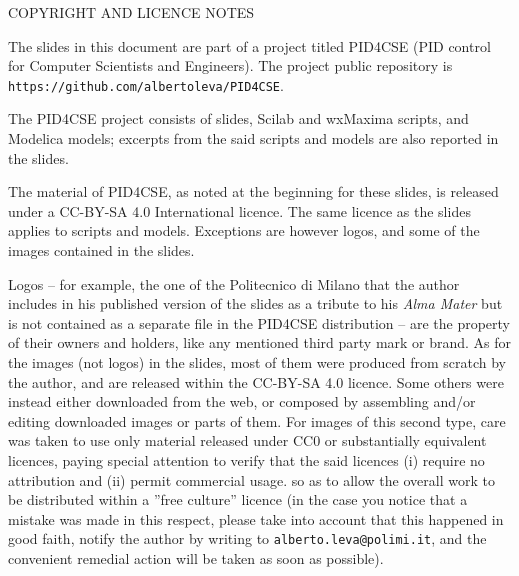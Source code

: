 \begin{frame}
 COPYRIGHT AND LICENCE NOTES \\
 {\tiny

\vspace{3mm}The slides in this document are part of a project titled PID4CSE (PID control for Computer Scientists and Engineers). The project public repository is \texttt{https://github.com/albertoleva/PID4CSE}.\par

\vspace{1mm}The PID4CSE project consists of slides, Scilab and wxMaxima scripts, and Modelica models; excerpts from the said scripts and models are also reported in the slides.\par
 
\vspace{1mm}The material of PID4CSE, as noted at the beginning for these slides, is released under a CC-BY-SA 4.0 International licence. The same licence as the slides applies to scripts and models. Exceptions are however logos, and some of the images contained in the slides.\par

\vspace{1mm}Logos -- for example, the one of the Politecnico di Milano that the author includes in his published version of the slides as a tribute to his \emph{Alma Mater} but is not contained as a separate file in the PID4CSE distribution -- are the property of their owners and holders, like any mentioned third party mark or brand. As for the images (not logos) in the slides, most of them were produced from scratch by the author, and are released within the CC-BY-SA 4.0 licence. Some others were instead either downloaded from the web, or composed by assembling and/or editing downloaded images or parts of them. For images of this second type, care was taken to use only material released under CC0 or substantially equivalent licences, paying special attention to verify that the said licences (i) require no attribution and (ii) permit commercial usage. so as to allow the overall work to be distributed within a ''free culture'' licence (in the case you notice that a mistake was made in this respect, please take into account that this happened in good faith, notify the author by writing to \texttt{alberto.leva@polimi.it}, and the convenient remedial action will be taken as soon as possible).\par

}
\end{frame}
